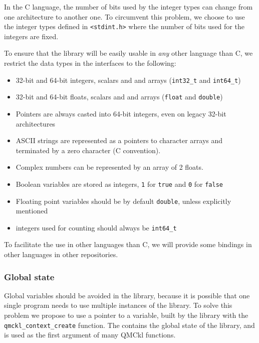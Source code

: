 In the C language, the number of bits used by the integer types can
change from one architecture to another one. To circumvent this
problem, we choose to use the integer types defined in
\texttt{<stdint.h>} where the number of bits used for the
integers are fixed.

To ensure that the library will be easily usable in \emph{any} other
language than C, we restrict the data types in the interfaces to the
following:
\begin{itemize}
\item 32-bit and 64-bit integers, scalars and and arrays
  (\texttt{int32_t} and \texttt{int64_t})
\item 32-bit and 64-bit floats, scalars and and arrays
  (\texttt{float} and \texttt{double})
\item Pointers are always casted into 64-bit integers, even on legacy 32-bit architectures
\item ASCII strings are represented as a pointers to character arrays
  and terminated by a zero character (C convention).
\item Complex numbers can be represented by an array of 2 floats.
\item Boolean variables are stored as integers, \texttt{1} for
\texttt{true} and \texttt{0} for \texttt{false}
\item Floating point variables should be by default
\texttt{double}, unless explicitly mentioned
\item integers used for counting should always be \texttt{int64_t}
\end{itemize}

To facilitate the  use in other languages than C, we will provide some
bindings in other languages in other repositories.


\subsubsection{Global state}

Global variables should  be avoided in the library,  because it is
possible that one  single program needs to  use multiple instances
of the library. To solve this  problem we propose to use a pointer
to a {\context}  variable,  built   by  the  library   with  the
\texttt{qmckl_context_create} function. The
{\context} contains the global state of the library, and is used as
the first argument of many \ac{QMCkl} functions.

